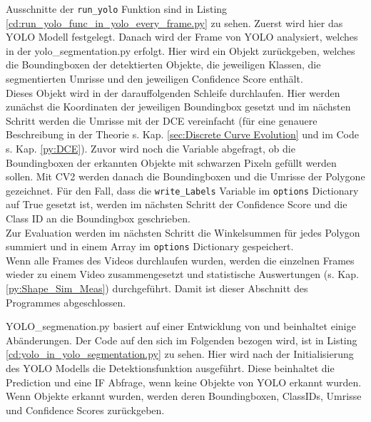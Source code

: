 {	\fi \ifimportant Ausschnitte der \lstinline|run_yolo| Funktion sind in Listing \ref{cd:run_yolo_func_in_yolo_every_frame.py} zu sehen. \fi Zuerst wird hier das YOLO Modell festgelegt. Danach wird der Frame von YOLO analysiert, welches in der yo\-lo\-\_seg\-men\-tat\-ion.py erfolgt. Hier wird ein Objekt zurückgeben, welches die Boundingboxen der detektierten Objekte, die jeweiligen Klassen, die segmentierten Umrisse und den jeweiligen Confidence Score enthält. \\
	Dieses Objekt wird in der darauffolgenden Schleife durchlaufen. Hier werden zunächst die Koordinaten der jeweiligen Boundingbox gesetzt und im nächsten Schritt werden die Umrisse mit der DCE vereinfacht (für eine genauere Beschreibung in der Theorie s. Kap. \ref{sec:Discrete Curve Evolution} und im Code s. Kap. \ref{py:DCE}). 
	Zuvor wird noch die Variable abgefragt, ob die Boundingboxen der erkannten Objekte mit schwarzen Pixeln gefüllt werden sollen. Mit CV2 werden danach die Boundingboxen und die Umrisse der Polygone gezeichnet. Für den Fall, dass die \lstinline|write_Labels| Variable im \lstinline|options| Dictionary auf True gesetzt ist, werden im nächsten Schritt der Confidence Score und die Class ID an die Boundingbox geschrieben. \\
	Zur Evaluation werden im nächsten Schritt die Winkelsummen für jedes Polygon summiert und in einem Array im \lstinline|options| Dictionary gespeichert. \\
	Wenn alle Frames des Videos durchlaufen wurden, werden die einzelnen Frames wieder zu einem Video zusammengesetzt und statistische Auswertungen (s. Kap. \ref{py:Shape_Sim_Meas}) durchgeführt. Damit ist dieser Abschnitt des Programmes abgeschlossen.\\
	\ifimportant
	
	\fi YOLO\_segmenation.py basiert auf einer Entwicklung von \citeauthor{Canu_pysource} \citep{Canu_pysource} und beinhaltet einige Abänderungen. \ifimportant Der Code auf den sich im Folgenden bezogen wird, ist in Listing \ref{cd:yolo_in_yolo_segmentation.py} zu sehen. \fi Hier wird nach der Initialisierung des YOLO Modells die Detektionsfunktion ausgeführt. Diese beinhaltet die Prediction und eine IF Abfrage, wenn keine Objekte von YOLO erkannt wurden. Wenn Objekte erkannt wurden, werden deren Boundingboxen, ClassIDs, Umrisse und Confidence Scores zurückgeben. 
	}

